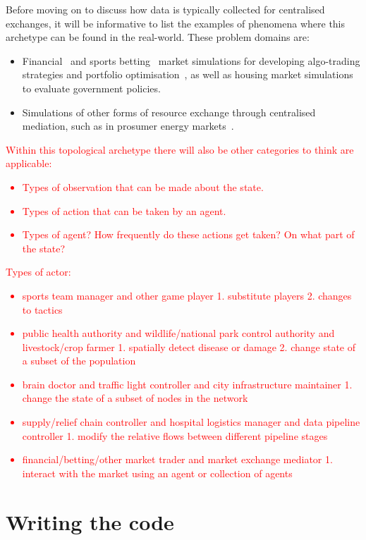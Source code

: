 Before moving on to discuss how data is typically collected for centralised exchanges, it will be informative to list the examples of phenomena where this archetype can be found in the real-world. These problem domains are:
\begin{itemize}
\item{Financial~\cite{fischer2018reinforcement,meng2019reinforcement} and sports betting~\cite{cliff2021bbe} market simulations for developing algo-trading strategies and portfolio optimisation~\cite{dangi2013financial}, as well as housing market simulations~\cite{yilmaz2018stochastic,carro2023heterogeneous} to evaluate government policies.}
\item{Simulations of other forms of resource exchange through centralised mediation, such as in prosumer energy markets~\cite{may2023multi}.} 
\end{itemize}

\textcolor{red}{Within this topological archetype there will also be other categories to think are applicable:
\begin{itemize}
\item{Types of observation that can be made about the state.}
\item{Types of action that can be taken by an agent.}
\item{Types of agent? How frequently do these actions get taken? On what part of the state?}
\end{itemize}
}

\textcolor{red}{Types of actor:
\begin{itemize}
\item{sports team manager and other game player 1. substitute players 2. changes to tactics}
\item{public health authority and wildlife/national park control authority and livestock/crop farmer 1. spatially detect disease or damage 2. change state of a subset of the population}
\item{brain doctor and traffic light controller and city infrastructure maintainer 1. change the state of a subset of nodes in the network}
\item{supply/relief chain controller and hospital logistics manager and data pipeline controller 1. modify the relative flows between different pipeline stages}
\item{financial/betting/other market trader and market exchange mediator 1. interact with the market using an agent or collection of agents}
\end{itemize}}

\section{\sffamily Writing the code}
